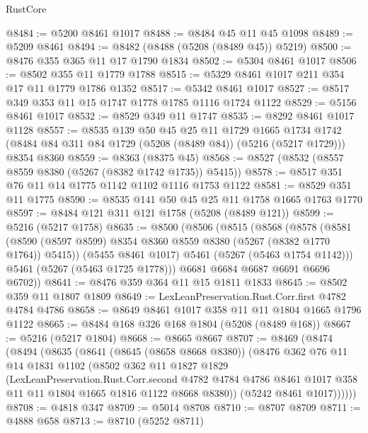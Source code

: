 \begin{lexlean}{RustCore}
\begin{coremodule}
@8484 := @5200 @8461 @1017
@8488 := @8484 @45 @11 @45 @1098
@8489 := @5209 @8461
@8494 := @8482 (@8488 (@5208 (@8489 @45)) @5219)
@8500 := @8476 @355 @365 @11 @17 @1790 @1834
@8502 := @5304 @8461 @1017
@8506 := @8502 @355 @11 @1779 @1788
@8515 := @5329 @8461 @1017 @211 @354 @17 @11 @1779 @1786 @1352
@8517 := @5342 @8461 @1017
@8527 := @8517 @349 @353 @11 @15 @1747 @1778 @1785 @1116 @1724 @1122
@8529 := @5156 @8461 @1017
@8532 := @8529 @349 @11 @1747
@8535 := @8292 @8461 @1017 @1128
@8557 := @8535
    @139
    @50
    @45
    @25
    @11
    @1729
    @1665
    @1734
    @1742
    (@8484 @84 @311 @84 @1729 (@5208 (@8489 @84)) (@5216 (@5217 @1729)))
    @8354
    @8360
@8559 := @8363 (@8375 @45)
@8568 := @8527 (@8532 (@8557 @8559 @8380 (@5267 (@8382 @1742 @1735)) @5415))
@8578 := @8517 @351 @76 @11 @14 @1775 @1142 @1102 @1116 @1753 @1122
@8581 := @8529 @351 @11 @1775
@8590 := @8535 @141 @50 @45 @25 @11 @1758 @1665 @1763 @1770
@8597 := @8484 @121 @311 @121 @1758 (@5208 (@8489 @121))
@8599 := @5216 (@5217 @1758)
@8635 := @8500
    (@8506
      (@8515
        (@8568
          (@8578
            (@8581 (@8590 (@8597 @8599) @8354 @8360 @8559 @8380 (@5267 (@8382 @1770 @1764)) @5415))
            (@5455 @8461 @1017)
            @5461
            (@5267 (@5463 @1754 @1142)))
          @5461
          (@5267 (@5463 @1725 @1778)))
        @6681
        @6684
        @6687
        @6691
        @6696
        @6702))
@8641 := @8476 @359 @364 @11 @15 @1811 @1833
@8645 := @8502 @359 @11 @1807 @1809
@8649 := LexLeanPreservation.Rust.Corr.first @4782 @4784 @4786
@8658 := @8649 @8461 @1017 @358 @11 @11 @1804 @1665 @1796 @1122
@8665 := @8484 @168 @326 @168 @1804 (@5208 (@8489 @168))
@8667 := @5216 (@5217 @1804)
@8668 := @8665 @8667
@8707 := @8469
    (@8474
      (@8494
        (@8635
          (@8641
            (@8645 (@8658 @8668 @8380))
            (@8476
              @362
              @76
              @11
              @14
              @1831
              @1102
              (@8502
                @362
                @11
                @1827
                @1829
                (LexLeanPreservation.Rust.Corr.second
                  @4782
                  @4784
                  @4786
                  @8461
                  @1017
                  @358
                  @11
                  @11
                  @1804
                  @1665
                  @1816
                  @1122
                  @8668
                  @8380))
              (@5242 @8461 @1017))))))
@8708 := @4818 @347
@8709 := @5014 @8708
@8710 := @8707 @8709
@8711 := @4888 @658
@8713 := @8710 (@5252 @8711)

\end{coremodule}
\end{lexlean}
